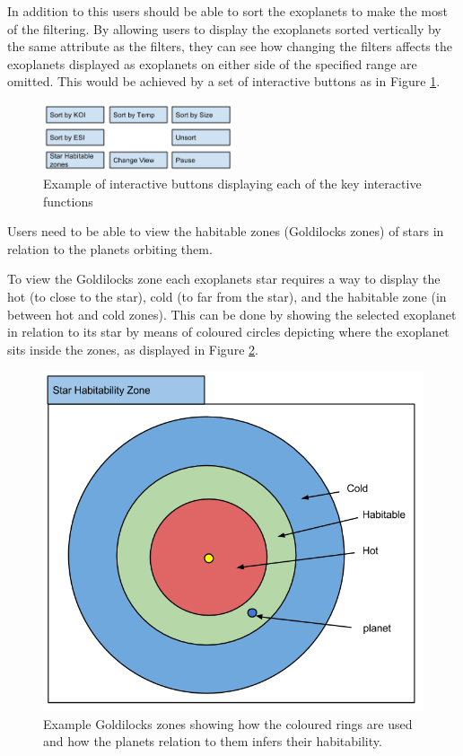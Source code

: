 \begin{enumerate}
In addition to this users should be able to sort the exoplanets to make
the most of the filtering. By allowing users to display the exoplanets sorted
vertically by the same attribute as the filters, they can see how
changing the filters affects the exoplanets displayed as exoplanets on either
side of the specified range are omitted. This would be achieved by a set of
interactive buttons as in Figure \ref{fig:mockButtons}.

\begin{figure}[H]
  \centering
      \includegraphics[width=0.5\textwidth]{images/mockButtons.png}
  \caption[Example of interactive buttons]{Example of interactive buttons
displaying each of the key interactive functions}  
  \label{fig:mockButtons}
\end{figure}

\clearpage
{\bf
 \item[R5.] Users need to be able to view the habitable zones (Goldilocks zones)
of stars in
relation to the planets orbiting them.
}

To view the Goldilocks zone each exoplanets star requires a way to display
the hot (to close to the star), cold (to far from the star), and the habitable
zone (in between hot and cold zones). This can be done by showing
the selected exoplanet in relation to its star by means of coloured circles
depicting where the exoplanet sits inside the zones, as displayed in Figure
\ref{fig:hab}. 

\begin{figure}[H]
  \centering
      \includegraphics[width=.5\textwidth]{images/mockStarHabitability.png}
  \caption[Example of Goldilocks zones]{Example Goldilocks zones showing how the
coloured rings are used and how the planets relation to them infers their
habitability.}  
  \label{fig:hab}
\end{figure}




\end{enumerate}
\clearpage
